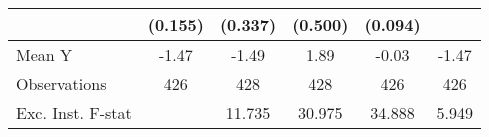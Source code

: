 {\begin{tabular}{l*{5}{c}}
            &     (0.155)         &     (0.337)         &     (0.500)         &     (0.094)         &                     \\
\midrule
Mean Y      &       -1.47         &       -1.49         &        1.89         &       -0.03         &       -1.47         \\
Observations&         426         &         428         &         428         &         426         &         426         \\
Exc. Inst. F-stat&                     &      11.735         &      30.975         &      34.888         &       5.949         \\
\bottomrule
\end{tabular}
}
